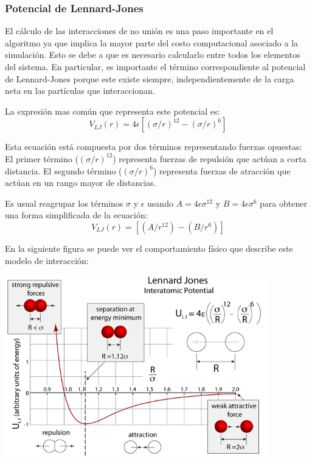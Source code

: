 \documentclass[a4paper,10pt]{report}
\begin{document}
\subsubsection{Potencial de Lennard-Jones}

El cálculo de las interacciones de no unión es una paso importante en el algoritmo ya que implica la mayor parte del costo computacional asociado a la simulación. 
Esto se debe a que es necesario calcularlo entre todos los elementos del sistema. 
En particular, es importante el término correspondiente al potencial de Lennard-Jones porque este existe siempre, independientemente de la carga neta en las partículas que interaccionan.

La expresión mas común que representa este potencial es: 
\begingroup
\fontsize{14pt}{5pt}
\begin{equation} V_{LJ}(r)= 4 \epsilon [ (\sigma/r)^{12} - (\sigma/r)^6] \end{equation}
\endgroup

Esta ecuación está compuesta por dos términos representando fuerzas opuestas:
El primer término ($(\sigma/r)^{12}$) representa fuerzas de repulsión que actúan a corta distancia.
El segundo término ($(\sigma/r)^{6}$) representa fuerzas de atracción que actúan en un rango mayor de distancias.

\vspace{10pt}
Es usual reagrupar los términos $\sigma$ y  $\epsilon$ usando  
$A=4\epsilon\sigma^{12}  $  y  $B=4\epsilon\sigma^6$ para obtener una forma simplificada de la ecuación:   \begin{equation}  V_{LJ}(r)= [ (A/r^{12}) - (B/r^6)] \end{equation}

\vspace{20pt}


En la siguiente figura se puede ver el comportamiento físico que describe este modelo de interacción:


\vspace{14pt}
\begin{center}
\includegraphics[height=8cm,keepaspectratio, width=\textwidth]{img/LennardJonesFull.png}
\end{center}
\end{document}
